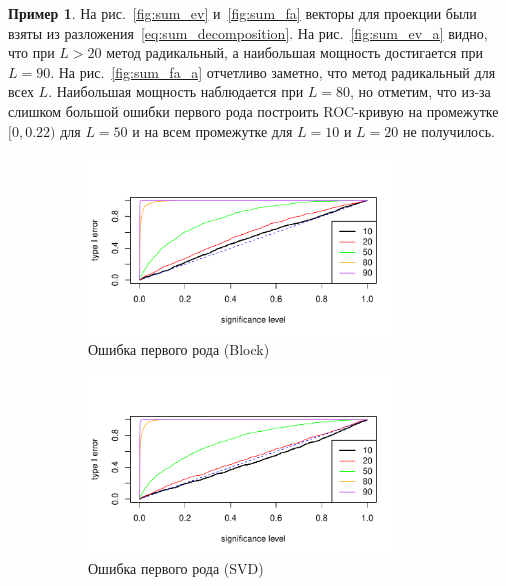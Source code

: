 \documentclass[specialist,
substylefile = spbu_report.rtx,
subf,href,colorlinks=true, 12pt]{disser}
\theoremstyle{definition}
\newtheorem{example}{Пример}
\begin{document}
\begin{example}
На рис.~\ref{fig:sum_ev} и~\ref{fig:sum_fa} векторы для проекции были взяты из разложения~\eqref{eq:sum_decomposition}. На рис.~\ref{fig:sum_ev_a} видно, что при $L>20$ метод радикальный, а наибольшая мощность достигается при $L=90$. На рис.~\ref{fig:sum_fa_a} отчетливо заметно, что метод радикальный для всех $L$. Наибольшая мощность наблюдается при $L=80$, но отметим, что из-за слишком большой ошибки первого рода построить ROC-кривую на промежутке $[0,0.22)$ для $L=50$ и на всем промежутке для $L=10$ и $L=20$ не получилось.
\begin{figure}[h!]
	\captionsetup[subfigure]{justification=Centering}
	\begin{subfigure}[t]{0.5\textwidth}
		\centering
		\includegraphics[width=0.9\textwidth]{img/type1error_block_ev.pdf}
		\caption{Ошибка первого рода (Block)}
		\label{fig:block_ev_a}
	\end{subfigure}\hspace{\fill}
	\begin{subfigure}[t]{0.5\textwidth}
		\centering
		\includegraphics[width=0.9\textwidth]{img/type1error_mssa_ev.pdf}
		\caption{Ошибка первого рода (SVD)}
	\end{subfigure}
	\bigskip
	\begin{subfigure}[t]{0.5\textwidth}

\end{subfigure}
\end{figure}
\end{example}
\end{document}
